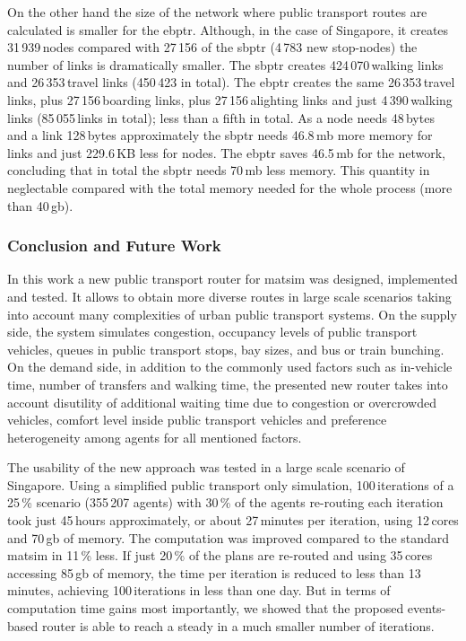On the other hand the size of the network where public transport routes are calculated is smaller for the \gls{ebptr}. Although, in the case of Singapore, it creates 31\,939\,nodes compared with 27\,156 of the \gls{sbptr} (4\,783 new stop-nodes) the number of links is dramatically smaller. The \gls{sbptr} creates 424\,070\,walking links and 26\,353\,travel links (450\,423 in total). The \gls{ebptr} creates the same 26\,353\,travel links, plus 27\,156\,boarding links, plus 27\,156\,alighting links and just 4\,390\,walking links (85\,055\,links in total); less than a fifth in total. As a node needs 48\,bytes and a link 128\,bytes approximately the \gls{sbptr} needs 46.8\,\gls{mb} more memory for links and just 229.6\,KB less for nodes. The \gls{ebptr} saves 46.5\,\gls{mb} for the network, concluding that in total the \gls{sbptr} needs 70\,\gls{mb} less memory. This quantity in neglectable compared with the total memory needed for the whole process (more than 40\,\gls{gb}).

\subsubsection{Conclusion and Future Work} 
\label{sec:ConclusionsAndOutlook}
In this work a new public transport router for \gls{matsim} was designed, implemented and tested. It allows to obtain more diverse routes in large scale scenarios taking into account many complexities of urban public transport systems. On the supply side, the system simulates congestion, occupancy levels of public transport vehicles, queues in public transport stops, bay sizes, and bus or train bunching. On the demand side, in addition to the commonly used factors such as in-vehicle time, number of transfers and walking time, the presented new router takes into account disutility of additional waiting time due to congestion or overcrowded vehicles, comfort level inside public transport vehicles and preference heterogeneity among agents for all mentioned factors.

The usability of the new approach was tested in a large scale scenario of Singapore. Using a simplified public transport only simulation, 100\,iterations of a 25\,\% scenario (355\,207 agents) with 30\,\% of the agents re-routing each iteration took just 45\,hours approximately, or about 27\,minutes per iteration, using 12\,cores and 70\,\gls{gb} of memory. The computation was improved compared to the standard \gls{matsim} in 11\,\% less. If just 20\,\% of the plans are re-routed and using 35\,cores accessing 85\,\gls{gb} of memory, the time per iteration is reduced to less than 13\,minutes, achieving 100\,iterations in less than one day. But in terms of computation time gains most importantly, we showed that the proposed events-based router is able to reach a steady in a much smaller number of iterations.

